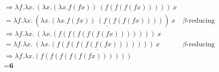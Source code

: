\documentclass[addpoints]{exam}
\renewcommand{\L}[2]{\lambda #1.#2}
\begin{document}
\begin{questions}
\begin{solutionbox}{12cm}
\begin{align*}
    & \Rightarrow \L{f}{\L{x}{~(\L{x}{(\L{x}{f (f x)})~(f (f (f (f x))))})~x}} & \\
    & = \L{f}{\L{x}{~(\L{x}{\underline{(\L{x}{f (f x)})~(f (f (f (f x))))}})~x}} & \textrm{$\beta$-reducing underlined term}\\
    & \Rightarrow \L{f}{\L{x}{~(\L{x}{(f (f (f (f (f (f x))))))})~x}} & \\
    & = \L{f}{\L{x}{~\underline{(\L{x}{(f (f (f (f (f (f x))))))})~x}}} & \textrm{$\beta$-reducing underlined term}\\
    & \Rightarrow \L{f}{\L{x}{(f (f (f (f (f (f x))))))}} & \\
    & = \textbf{6}
  \end{align*}
  \end{solutionbox}


\end{questions}
\end{document}
